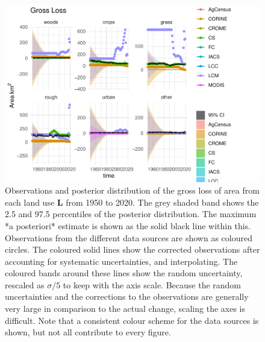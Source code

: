 \documentclass[
]{book}
\begin{document}
\begin{figure}
\includegraphics[width=1.3\linewidth]{Results_ni_files/figure-latex/plotL-1} \caption{ Observations and posterior distribution of the gross loss of area from each land use $\mathbf{L}$ from 1950 to 2020.  The grey shaded band shows the 2.5 and 97.5 percentiles of the posterior distribution. The maximum *a posteriori* estimate is shown as the solid black line within this. Observations from the different data sources are shown as coloured circles. The coloured solid lines show the corrected observations after accounting for systematic uncertainties, and interpolating. The coloured bands around these lines show the random uncertainty, rescaled as $\sigma /5$ to keep with the axis scale. Because the random uncertainties and the corrections to the observations are generally very large in comparison to the actual change, scaling the axes is difficult. Note that a consistent colour scheme for the data sources is shown, but not all contribute to every figure.}\label{fig:plotL}
\end{figure}
\end{document}

